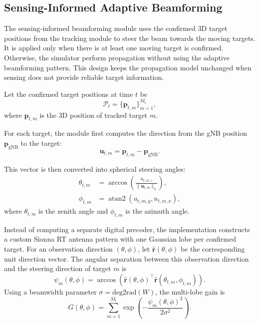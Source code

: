 \subsection{Sensing-Informed Adaptive Beamforming}
\label{subsec:beamforming}

The sensing-informed beamforming module uses the confirmed 3D target positions from the tracking module to steer the beam towards the moving targets.
It is applied only when there is at least one moving target is confirmed.
Otherwise, the simulator perform propagation without using the adaptive beamforming pattern.
This design keeps the propagation model unchanged when sensing does not provide reliable target information.

Let the confirmed target positions at time $t$ be
\begin{equation}
    \mathcal{P}_t =
    \{\mathbf{p}_{t,m}\}_{m=1}^{M_t},
\end{equation}
where $\mathbf{p}_{t,m}$ is the 3D position of tracked target $m$.

For each target, the module first computes the direction from the gNB position $\mathbf{p}_{\mathrm{gNB}}$ to the target:
\begin{equation}
    \mathbf{u}_{t,m}
    =
    \mathbf{p}_{t,m} - \mathbf{p}_{\mathrm{gNB}}.
\end{equation}

This vector is then converted into spherical steering angles:
\begin{align}
    \theta_{t,m}
     & =
    \arccos\!\left(
    \frac{u_{t,m,z}}{\|\mathbf{u}_{t,m}\|_2}
    \right), \\
    \phi_{t,m}
     & =
    \operatorname{atan2}(u_{t,m,y},u_{t,m,x}),
\end{align}
where $\theta_{t,m}$ is the zenith angle and $\phi_{t,m}$ is the azimuth angle.

Instead of computing a separate digital precoder, the implementation constructs a custom Sionna RT antenna pattern with one Gaussian lobe per confirmed target.
For an observation direction $(\theta,\phi)$, let $\hat{\mathbf{r}}(\theta,\phi)$ be the corresponding unit direction vector.
The angular separation between this observation direction and the steering direction of target $m$ is
\begin{equation}
    \psi_m(\theta,\phi)
    =
    \arccos\!\left(
    \hat{\mathbf{r}}(\theta,\phi)^{\!\top}
    \hat{\mathbf{r}}(\theta_{t,m},\phi_{t,m})
    \right).
\end{equation}
Using a beamwidth parameter $\sigma=\mathrm{deg2rad}(W)$, the multi-lobe gain is
\begin{equation}
    G(\theta,\phi)
    =
    \sum_{m=1}^{M_t}
    \exp\!\left(
    -\frac{\psi_m(\theta,\phi)^2}{2\sigma^2}
    \right).
    \label{eq:sensing_informed_multilobe}
\end{equation}

